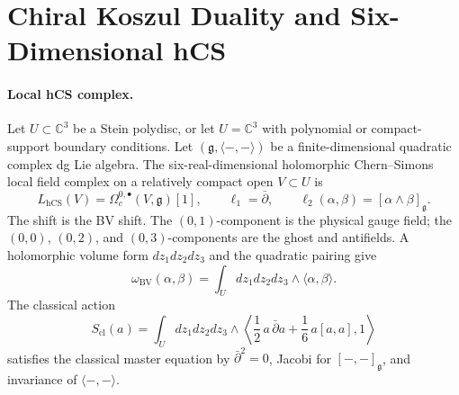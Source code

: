 \providecommand{\Obs}{\mathrm{Obs}}
\providecommand{\hCS}{\mathrm{hCS}}
\providecommand{\CE}{\mathrm{CE}}
\providecommand{\Ch}{\mathrm{Ch}}
\providecommand{\Dolb}{\mathrm{Dolb}}
\providecommand{\Conf}{\mathrm{Conf}}
\providecommand{\chir}{\mathrm{chir}}
\providecommand{\dbar}{\bar\partial}
\providecommand{\kch}{\kappa_{\mathrm{ch}}}
\providecommand{\kcat}{\kappa_{\mathrm{cat}}}
\providecommand{\kBKM}{\kappa_{\mathrm{BKM}}}
\providecommand{\kfib}{\kappa_{\mathrm{fiber}}}
\providecommand{\Ran}{\mathrm{Ran}}
\providecommand{\Sym}{\mathrm{Sym}}
\providecommand{\Hom}{\mathrm{Hom}}
\providecommand{\C}{\mathbb{C}}
\providecommand{\cO}{\mathcal{O}}
\providecommand{\cE}{\mathcal{E}}
\providecommand{\cL}{\mathcal{L}}
\providecommand{\cM}{\mathcal{M}}
\providecommand{\cD}{\mathcal{D}}
\providecommand{\g}{\mathfrak{g}}
\providecommand{\Lie}{\mathrm{Lie}}
\providecommand{\Coalg}{\mathrm{Coalg}}
\providecommand{\Alg}{\mathrm{Alg}}
\providecommand{\Op}{\mathrm{Op}}
\providecommand{\Bar}{\mathrm{Bar}}
\providecommand{\Cobar}{\mathrm{Cobar}}
\providecommand{\BV}{\mathrm{BV}}
\providecommand{\Loc}{\mathrm{Loc}}
\providecommand{\QME}{\mathrm{QME}}
\providecommand{\hb}{\hbar}
\providecommand{\PhiFA}{\Phi^{\mathrm{FA}}}
\providecommand{\SpCh}{\mathrm{Sp}^{\mathrm{ch}}}
\providecommand{\Rep}{\mathrm{Rep}}
\providecommand{\Zchder}{Z^{\mathrm{der}}_{\mathrm{ch}}}
\providecommand{\Eone}{E_1}
\providecommand{\Etwo}{E_2}
\providecommand{\Ethree}{E_3}

\section*{Chiral Koszul Duality and Six-Dimensional hCS}

\paragraph{Local hCS complex.}
Let \(U\subset\C^3\) be a Stein polydisc, or let \(U=\C^3\) with
polynomial or compact-support boundary conditions. Let
\((\g,\langle-,-\rangle)\) be a finite-dimensional quadratic complex dg
Lie algebra. The six-real-dimensional holomorphic Chern--Simons local
field complex on a relatively compact open \(V\subset U\) is
\[
  L_{\hCS}(V)=\Omega^{0,\bullet}_c(V,\g)[1],
  \qquad
  \ell_1=\dbar,
  \qquad
  \ell_2(\alpha,\beta)=[\alpha\wedge\beta]_\g .
\]
The shift is the BV shift. The \((0,1)\)-component is the physical gauge
field; the \((0,0)\), \((0,2)\), and \((0,3)\)-components are the ghost
and antifields. A holomorphic volume form \(dz_1dz_2dz_3\) and the
quadratic pairing give
\[
  \omega_{\BV}(\alpha,\beta)
  =
  \int_U dz_1dz_2dz_3\wedge\langle\alpha,\beta\rangle .
\]
The classical action
\[
  S_{\mathrm{cl}}(a)
  =
  \int_U dz_1dz_2dz_3\wedge
  \left\langle
    \frac12\,a\,\dbar a+\frac16\,a[a,a],
    1
  \right\rangle
\]
satisfies the classical master equation by \(\dbar^2=0\), Jacobi for
\([-,-]_\g\), and invariance of \(\langle-,-\rangle\).


